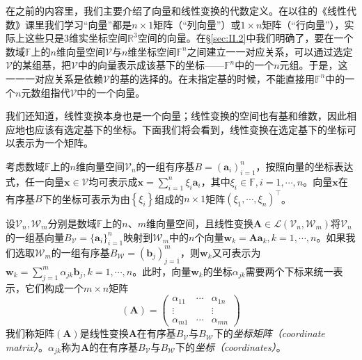 \documentclass[main.tex]{subfiles}
\begin{document}
在之前的内容里，我们主要介绍了向量和线性变换的代数定义。在以往的《线性代数》课里我们学习“向量”都是$n\times 1$矩阵（“列向量”）或$1\times n$矩阵（“行向量”），实际上这些只是3维实坐标空间$\mathbb{R}^3$空间的向量。在\S\ref{sec:II.2}中我们明确了，要在一个数域$\mathbb{F}$上的$n$维向量空间$\mathcal{V}$与$n$维坐标空间$\mathbb{F}^n$之间建立一一对应关系，可以通过选定$\mathcal{V}$的某组基，把$\mathcal{V}$中的向量表示成该基下的坐标——$\mathbb{F}^n$中的一个$n$元组。于是，这一一一对应关系是依赖$\mathcal{V}$的基的选择的。在未指定基的时候，不能直接用$\mathbb{F}^n$中的一个$n$元数组指代$\mathcal{V}$中的一个向量。

我们还知道，线性变换本身也是一个向量；线性变换的空间也有基和维数，因此相应地也应该有选定基下的坐标。下面我们将会看到，线性变换在选定基下的坐标可以表示为一个矩阵\cite[\S7.3“3”]{周胜林2012线性代数}。

考虑数域$\mathbb{F}$上的$n$维向量空间$\mathcal{V}_n$的一组有序基$B=\left(\mathbf{a}_i\right)_{i=1}^n$，按照向量的坐标表达式，任一向量$\mathbf{x}\in\mathcal{V}$均可表示成$\mathbf{x}=\sum_{i=1}^n\xi_i\mathbf{a}_i$，其中$\xi_i\in\mathbb{F},i=1,\cdots,n$。向量$\mathbf{x}$在有序基$B$下的坐标可表示为由$\left\{\xi_i\right\}$组成的$n\times 1$矩阵$\left(\xi_1,\cdots,\xi_n\right)^\intercal$。

设$\mathcal{V}_n,\mathcal{W}_m$分别是数域$\mathbb{F}$上的$n$、$m$维向量空间，且线性变换$\mathbf{A}\in\mathcal{L}\left(\mathcal{V}_n,\mathcal{W}_m\right)$将$\mathcal{V}_n$的一组基向量$B_{\mathcal{V}}=\{\mathbf{a}_i\}_{i=1}^n$映射到$\mathcal{W}_m$中的$n$个向量$\mathbf{w}_k=\mathbf{Aa}_k,k=1,\cdots,n$。如果我们选取$\mathcal{W}_m$的一组有序基$B_{\mathcal{W}}=\left(\mathbf{b}_j\right)_{j=1}^m$，则$\mathbf{w}_k$又可表示为$\mathbf{w}_k=\sum_{j=1}^m\alpha_{jk}\mathbf{b}_j,k=1,\cdots,n$。此时，向量$\mathbf{w}_k$的坐标$\alpha_{jk}$需要两个下标来统一表示，它们构成一个$m\times n$矩阵
\[\left(\mathbf{A}\right)=\left(\begin{array}{ccc}\alpha_{11}&\cdots&\alpha_{1n}\\\vdots&&\vdots\\\alpha_{m1}&\cdots&\alpha_{mn}\end{array}\right)\]
我们称矩阵$\left(\mathbf{A}\right)$是线性变换$\mathbf{A}$在有序基$B_{\mathcal{V}}$与$B_{\mathcal{W}}$下的\emph{坐标矩阵（coordinate matrix）}。$\alpha_{jk}$称为$\mathbf{A}$的在有序基$B_{\mathcal{V}}$与$B_{\mathcal{W}}$下的\emph{坐标（coordinates）}。
\end{document}
